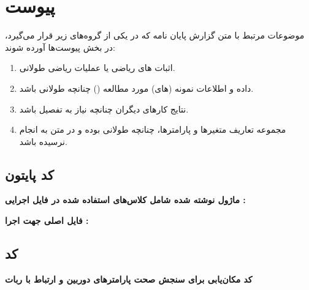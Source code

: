 \chapter*{‌پیوست}
موضوعات مرتبط با متن گزارش پایان نامه كه در يكی از گروه‌های زير قرار می‌گيرد، در بخش پيوست‌ها آورده شوند:
\begin{enumerate}
\item  اثبات های رياضی يا عمليات رياضی طولانی‌.‌
\item داده و اطلاعات نمونه (های) مورد مطالعه () چنانچه طولانی باشد‌.‌
\item نتايج كارهای ديگران چنانچه نياز به تفصيل باشد‌.‌
\item مجموعه تعاريف متغيرها و پارامترها، چنانچه طولانی بوده و در متن به انجام نرسيده باشد‌.‌
\end{enumerate}
\section*{کد پایتون }
\textbf{ماژول نوشته شده شامل کلاس‌های استفاده شده در فایل اجرایی :}
\begin{latin}
	
\end{latin}

\textbf{فایل اصلی جهت اجرا :}

\begin{latin}
	
\end{latin}
\section{کد }
\textbf{کد مکان‌یابی برای سنجش صحت پارامتر‌های دوربین و ارتباط با ربات}
\begin{latin}
	
\end{latin}

